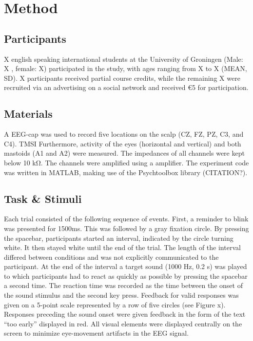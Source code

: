\section{Method}
\label{sec:method}

\subsection{Participants}
X english speaking international students at the University of Groningen (Male: X , female: X) participated in the study, with ages ranging from X to X (MEAN, SD). X participants received partial course credits, while the remaining X were recruited via an advertising on a social network and received €5 for participation.

\subsection{Materials}
A EEG-cap was used to record five locations on the scalp (CZ, FZ, PZ, C3, and C4). TMSI  Furthermore, activity of the eyes (horizontal and vertical) and both mastoids (A1 and A2) were measured. The impedances of all channels were kept below 10 kΩ.
The channels were amplified using a amplifier. The experiment code was written in MATLAB, making use of the Psychtoolbox library (CITATION?).

\subsection{Task \& Stimuli}
Each trial consisted of the following sequence of events. First, a reminder to blink was presented for 1500ms. This was followed by a gray fixation circle. By pressing the spacebar, participants started an interval, indicated by the circle turning white. It then stayed white until the end of the trial. The length of the interval differed between conditions and was not explicitly communicated to the participant. At the end of the interval a target sound (1000 Hz, 0.2 s) was played to which participants had to react as quickly as possible by pressing the spacebar a second time. The reaction time was recorded as the time between the onset of the sound stimulus and the second key press.
Feedback for valid responses was given on a 5-point scale represented by a row of five circles (see Figure x). Responses preceding the sound onset were given feedback in the form of the text “too early” displayed in red.
All visual elements were displayed centrally on the screen to minimize eye-movement artifacts in the EEG signal.

